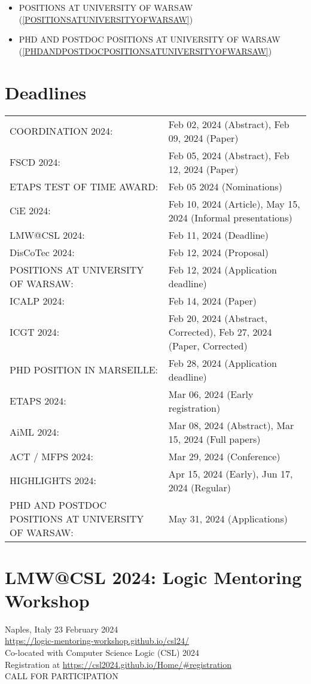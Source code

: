 \documentclass[prodmode,acmtecs]{acmsmall} %
\begin{document}
\begin{itemize}
\begin{itemize}\item POSITIONS AT UNIVERSITY OF WARSAW (\cref{POSITIONSATUNIVERSITYOFWARSAW})
\item PHD AND POSTDOC POSITIONS AT UNIVERSITY OF WARSAW (\cref{PHDANDPOSTDOCPOSITIONSATUNIVERSITYOFWARSAW})
\end{itemize} 
\end{itemize}\section{Deadlines}\label{deadlines}\begin{tabulary}{\linewidth}{LL}COORDINATION 2024:  & Feb 02, 2024 (Abstract), Feb 09, 2024 (Paper) \\
FSCD 2024:  & Feb 05, 2024 (Abstract), Feb 12, 2024 (Paper) \\
ETAPS TEST OF TIME AWARD:  & Feb 05 2024 (Nominations) \\
CiE 2024:  & Feb 10, 2024 (Article), May 15, 2024 (Informal presentations) \\
LMW@CSL 2024:  & Feb 11, 2024 (Deadline) \\
DisCoTec 2024:  & Feb 12, 2024 (Proposal) \\
POSITIONS AT UNIVERSITY OF WARSAW:  & Feb 12, 2024 (Application deadline) \\
ICALP 2024:  & Feb 14, 2024 (Paper) \\
ICGT 2024:  & Feb 20, 2024 (Abstract, Corrected), Feb 27, 2024 (Paper, Corrected) \\
PHD POSITION IN MARSEILLE:  & Feb 28, 2024 (Application deadline) \\
ETAPS 2024:  & Mar 06, 2024 (Early registration) \\
AiML 2024:  & Mar 08, 2024 (Abstract), Mar 15, 2024 (Full papers) \\
ACT / MFPS 2024:  & Mar 29, 2024 (Conference) \\
HIGHLIGHTS 2024:  & Apr 15, 2024 (Early), Jun 17, 2024 (Regular) \\
PHD AND POSTDOC POSITIONS AT UNIVERSITY OF WARSAW:  & May 31, 2024 (Applications) \\
\end{tabulary}
\section{LMW@CSL 2024: Logic Mentoring Workshop}\label{LMWCSL2024}  Naples, Italy 23 February 2024 \\ 
  \href{https://logic-mentoring-workshop.github.io/csl24/}{https://logic-mentoring-workshop.github.io/csl24/}\\ 
  Co-located with Computer Science Logic (CSL) 2024\\ 
  Registration at \href{https://csl2024.github.io/Home/#registration}{https://csl2024.github.io/Home/\#registration}\\ 
CALL FOR PARTICIPATION 
\end{document}
